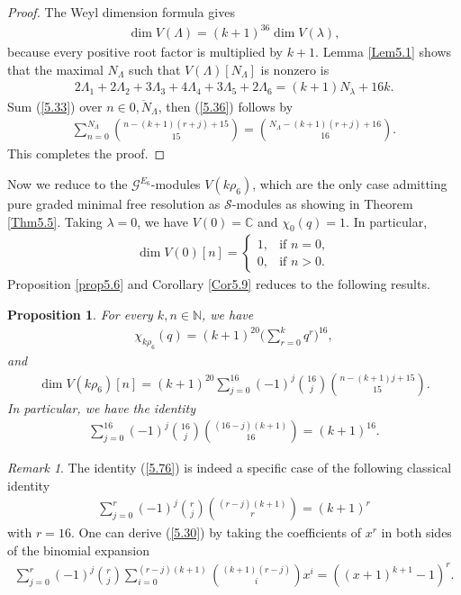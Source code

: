 \documentclass[12pt]{article}
\numberwithin{equation}{section}
\newtheorem{proposition}[theorem]{Proposition}
\theoremstyle{definition}
\theoremstyle{remark}
\newtheorem{remark}[theorem]{Remark}
\begin{document}
\begin{proof}
	The Weyl dimension formula gives
	\begin{eqnarray}
		\dim V(\Lambda)=(k+1)^{36}\dim V(\lambda),
	\end{eqnarray}
	because every positive root factor is multiplied by $k+1$.
	Lemma \ref{Lem5.1} shows that the maximal $N_{\Lambda}$ such that $V(\Lambda)[N_{\Lambda}]$ is nonzero is
	\begin{eqnarray}
		2\Lambda_1+2\Lambda_2+3\Lambda_3+4\Lambda_4+3\Lambda_5+2\Lambda_6=(k+1)N_\lambda+16k.
	\end{eqnarray}
	Sum (\ref{5.33}) over $n\in\overline{0,N_\Lambda}$, then (\ref{5.36}) follows by
	\begin{align}
		\sum_{n=0}^{N_\Lambda}\binom{n-(k+1)(r+j)+15}{15}=\binom{N_\Lambda-(k+1)(r+j)+16}{16}.
	\end{align}
	This completes the proof.
\end{proof}

Now we reduce to the $\mathscr{G}^{E_6}$-modules $V(k\rho_6)$, which are the only case admitting pure graded minimal free resolution as $\mathscr{S}$-modules as showing in Theorem \ref{Thm5.5}. Taking $\lambda=0$, we have $V(0)=\mathbb{C}$ and $\chi_{0}(q)=1$.
In particular,
\begin{align}
	\dim V(0)[n]=\begin{cases}
		1,&\text{if }n=0,\\
		0, &\text{if }n>0.
	\end{cases}
\end{align}
Proposition \ref{prop5.6} and Corollary \ref{Cor5.9} reduces to the following results.
\begin{proposition}\label{Prop5.3}
	For every $k,n\in\mathbb{N}$, we have
	\begin{eqnarray}
		\chi_{k\rho_6}(q)=(k+1)^{20}\big(\sum_{r=0}^{k}q^r\big)^{16},
	\end{eqnarray}
	and
	\begin{eqnarray}
		\dim V(k\rho_6)[n]=(k+1)^{20}\sum_{j=0}^{16}(-1)^{j}\binom{16}{j}\binom{n-(k+1)j+15}{15}.
	\end{eqnarray}
	In particular, we have the identity
	\begin{eqnarray}
		\sum_{j=0}^{16}(-1)^j\binom{16}{j}\binom{(16-j)(k+1)}{16}=(k+1)^{16}. \label{5.76}
	\end{eqnarray}
\end{proposition}
\begin{remark}
	The identity (\ref{5.76}) is indeed a specific case of the following classical identity
	\begin{eqnarray}
		\sum_{j=0}^{r}(-1)^j\binom{r}{j}\binom{(r-j)(k+1)}{r}=(k+1)^{r} \label{5.30}
	\end{eqnarray}
	with $r=16$. One can derive (\ref{5.30}) by taking the coefficients of $x^r$ in both sides of the binomial expansion
	\begin{eqnarray}
		\sum_{j=0}^r(-1)^j\binom{r}{j}\sum_{i=0}^{(r-j)(k+1)}\binom{(k+1)(r-j)}{i}x^{i}=((x+1)^{k+1}-1)^r.
	\end{eqnarray}
\end{remark}
\end{document}
